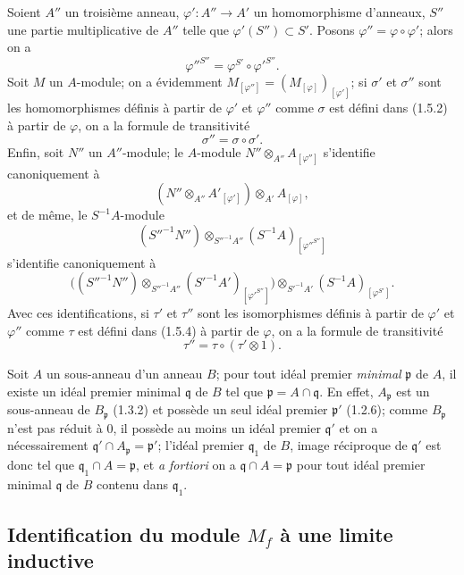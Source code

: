 
\begin{env}[1.5.7]
\label{0.1.5.7-fr}
Soient $A''$ un troisième anneau, $\varphi':A''\to A'$ un homomorphisme
d'anneaux, $S''$ une partie multiplicative de $A''$ telle que
$\varphi'(S'')\subset S'$. Posons $\varphi''=\varphi\circ\varphi'$; alors on a
\[
  \varphi''^{S''}=\varphi^{S'}\circ\varphi'^{S''}.
\]
Soit $M$ un $A$-module; on a évidemment
$M_{[\varphi'']}=(M_{[\varphi]})_{[\varphi']}$; si $\sigma'$ et $\sigma''$ sont
les homomorphismes définis à partir de $\varphi'$ et $\varphi''$ comme $\sigma$
est défini dans (1.5.2) à partir de $\varphi$, on a la formule de transitivité
\[
  \sigma''=\sigma\circ\sigma'.
\]
Enfin, soit $N''$ un $A''$-module; le $A$-module
$N''\otimes_{A''}A_{[\varphi'']}$ s'identifie canoniquement à
\[
  (N''\otimes_{A''}A'_{[\varphi']})\otimes_{A'}A_{[\varphi]},
\]
et de même, le $S^{-1}A$-module
\[
  (S''^{-1}N'')\otimes_{S''^{-1}A''}
  (S^{-1}A)_{[\varphi''^{S''}]}
\]
s'identifie canoniquement à
\[
  \bigl((S''^{-1}N'')\otimes_{S''^{-1}A''}
  (S'^{-1}A')_{[\varphi'^{S''}]}\bigr)
  \otimes_{S'^{-1}A'}(S^{-1}A)_{[\varphi^{S'}]}.
\]
Avec ces identifications, si $\tau'$ et $\tau''$ sont les isomorphismes définis
à partir de $\varphi'$ et $\varphi''$ comme $\tau$ est défini dans (1.5.4) à
partir de $\varphi$, on a la formule de transitivité
\[
  \tau''=\tau\circ(\tau'\otimes 1).
\]
\end{env}

\begin{env}[1.5.8]
\label{0.1.5.8-fr}
Soit $A$ un sous-anneau d'un anneau $B$; pour tout idéal premier
\emph{minimal} $\mathfrak p$ de $A$, il existe un idéal premier minimal
$\mathfrak q$ de $B$ tel que $\mathfrak p=A\cap\mathfrak q$. En effet,
$A_{\mathfrak p}$ est un sous-anneau de $B_{\mathfrak p}$ (1.3.2) et possède
un seul idéal premier $\mathfrak p'$ (1.2.6); comme $B_{\mathfrak p}$ n'est pas
réduit à $0$, il possède au moins un idéal premier $\mathfrak q'$ et on a
nécessairement $\mathfrak q'\cap A_{\mathfrak p}=\mathfrak p'$; l'idéal premier
$\mathfrak q_1$ de $B$, image réciproque de $\mathfrak q'$ est donc tel que
$\mathfrak q_1\cap A=\mathfrak p$, et \emph{a fortiori} on a
$\mathfrak q\cap A=\mathfrak p$ pour tout idéal premier minimal $\mathfrak q$
de $B$ contenu dans $\mathfrak q_1$.
\end{env}

\subsection{Identification du module $M_f$ à une limite inductive}
\label{subsection:0.1.6-fr}

